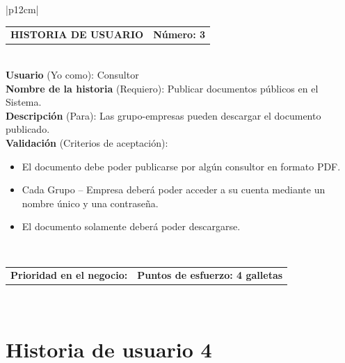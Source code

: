 \documentclass[11pt,letterpaper]{report}
\begin{document}
	\begin{center}	
	\begin{tabular}{|p{12cm}|}
		\hline
		\begin{tabular}{c|c}
			\textbf{HISTORIA DE USUARIO} & \textbf{Número: 3} \\
		\end{tabular} \\ \hline
		\textbf{Usuario} (Yo como): Consultor \\ \hline
		\textbf{Nombre de la historia} (Requiero): Publicar documentos públicos en el Sistema. \\ \hline
		\textbf{Descripción} (Para): Las grupo-empresas pueden descargar el documento publicado. \\ \hline
		\textbf{Validación} (Criterios de aceptación): \\
		\begin{minipage}{12cm}
			\begin{itemize}
				\item El documento debe poder publicarse por algún consultor en formato PDF.
				\item Cada Grupo – Empresa deberá poder acceder a su cuenta mediante un nombre único y una contraseña.
				\item El documento solamente deberá poder descargarse.
			\end{itemize}
		\end{minipage} \\ \hline
		\begin{tabular}{p{6cm}|c}
			\textbf{Prioridad en el negocio: } & \textbf{Puntos de esfuerzo: 4 galletas } \\
		\end{tabular} \\ \hline
	\end{tabular}
	\end{center}
	
	\section{Historia de usuario 4}
	
\end{document}
